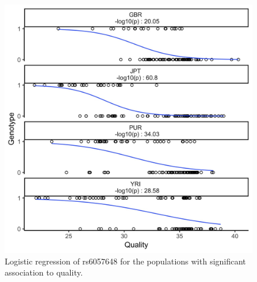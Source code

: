 \documentclass[9pt,lineno]{elife}
\begin{document}
\begin{figure}
\includegraphics[width=\hsize,keepaspectratio]{./Figures/RegressionPlot.jpg}
\caption{Logistic regression of rs6057648 for the populations with significant association to quality.}
\label{TwinsSNP}
\end{figure}
\end{document}
